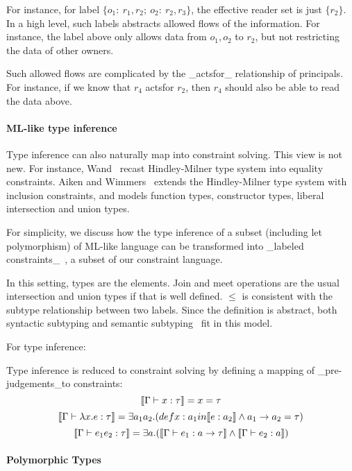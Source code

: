 For instance, for label $\{o_1:\ r_1,r_2;\ o_2:\ r_2,r_3\}$, the
effective reader set is just $\{r_2\}$. In a high level, such labels
abstracts allowed flows of the information. For instance, the label
above only allows data from $o_1, o_2$ to $r_2$, but not restricting
the data of other owners.

Such allowed flows are complicated by the _actsfor_ relationship of
principals. For instance, if we know that $r_4$ actsfor $r_2$, then
$r_4$ should also be able to read the data above.

\paragraph{ML-like type inference}

Type inference can also naturally map into constraint solving. This
view is not new. For instance, Wand~\cite{wand-typeinference} recast
Hindley-Milner type system into equality constraints. Aiken and
Wimmers~\cite{aiken-typeinclusion} extends the Hindley-Milner type
system with inclusion constraints, and models function types,
constructor types, liberal intersection and union types. 

For simplicity, we discuss how the type inference of a subset
(including let polymorphism) of ML-like language can be transformed
into _labeled constraints_~\cite{haack:slicing}, a subset of our
constraint language.

In this setting, types are the elements. Join and
meet operations are the usual intersection and union types if that is
well defined.
$\leq$ is consistent with the subtype relationship between two labels.
Since the definition is abstract, both syntactic subtyping 
and semantic subtyping~\cite{aiken-typeinclusion} fit in this model.

For type inference:

Type inference is reduced to constraint solving by defining a mapping
of _pre-judgements_to constraints:
\[\llbracket \Gamma \vdash x:\tau \rrbracket = x =\tau\]
\[\llbracket \Gamma \vdash \lambda x.e:\tau \rrbracket = \exists a_1 a_2.
(def x: a_1 in \llbracket e:a_2 \rrbracket \land a_1 \rightarrow a_2 =\tau)\]
\[\llbracket \Gamma\vdash e_1 e_2 : \tau \rrbracket = \exists a.(\llbracket \Gamma \vdash
e_1:a\rightarrow \tau \rrbracket\land \llbracket \Gamma\vdash e_2:a \rrbracket)\]


\paragraph{Polymorphic Types}

